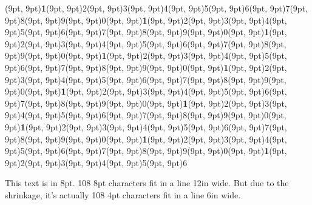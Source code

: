 \documentclass[10,a4paper]{article}
\newcommand{\highlight}[1]{{\color{red}\textbf{1}}}
\begin{document}
{{\begin{minipage}{12in}
\vspace{0.7\baselineskip}

\framebox(9pt, 9pt){\highlight{1}}\framebox(9pt,
9pt){2}\framebox(9pt, 9pt){3}\framebox(9pt,
9pt){4}\framebox(9pt, 9pt){5}\framebox(9pt,
9pt){6}\framebox(9pt, 9pt){7}\framebox(9pt,
9pt){8}\framebox(9pt, 9pt){9}\noindent\framebox(9pt, 9pt){0}\framebox(9pt, 9pt){\highlight{1}}\framebox(9pt,
9pt){2}\framebox(9pt, 9pt){3}\framebox(9pt,
9pt){4}\framebox(9pt, 9pt){5}\framebox(9pt,
9pt){6}\framebox(9pt, 9pt){7}\framebox(9pt,
9pt){8}\framebox(9pt, 9pt){9}\noindent\framebox(9pt, 9pt){0}\framebox(9pt, 9pt){\highlight{1}}\framebox(9pt,
9pt){2}\framebox(9pt, 9pt){3}\framebox(9pt,
9pt){4}\framebox(9pt, 9pt){5}\framebox(9pt,
9pt){6}\framebox(9pt, 9pt){7}\framebox(9pt,
9pt){8}\framebox(9pt, 9pt){9}\noindent\framebox(9pt, 9pt){0}\framebox(9pt, 9pt){\highlight{1}}\framebox(9pt,
9pt){2}\framebox(9pt, 9pt){3}\framebox(9pt,
9pt){4}\framebox(9pt, 9pt){5}\framebox(9pt,
9pt){6}\framebox(9pt, 9pt){7}\framebox(9pt,
9pt){8}\framebox(9pt, 9pt){9}\framebox(9pt, 9pt){0}\framebox(9pt, 9pt){\highlight{1}}\framebox(9pt,
9pt){2}\framebox(9pt, 9pt){3}\framebox(9pt,
9pt){4}\framebox(9pt, 9pt){5}\framebox(9pt,
9pt){6}\framebox(9pt, 9pt){7}\framebox(9pt,
9pt){8}\framebox(9pt, 9pt){9}\noindent\framebox(9pt, 9pt){0}\framebox(9pt, 9pt){\highlight{1}}\framebox(9pt,
9pt){2}\framebox(9pt, 9pt){3}\framebox(9pt,
9pt){4}\framebox(9pt, 9pt){5}\framebox(9pt,
9pt){6}\framebox(9pt, 9pt){7}\framebox(9pt,
9pt){8}\framebox(9pt, 9pt){9}\noindent\framebox(9pt, 9pt){0}\framebox(9pt, 9pt){\highlight{1}}\framebox(9pt,
9pt){2}\framebox(9pt, 9pt){3}\framebox(9pt,
9pt){4}\framebox(9pt, 9pt){5}\framebox(9pt,
9pt){6}\framebox(9pt, 9pt){7}\framebox(9pt,
9pt){8}\framebox(9pt, 9pt){9}\noindent\framebox(9pt, 9pt){0}\framebox(9pt, 9pt){\highlight{1}}\framebox(9pt,
9pt){2}\framebox(9pt, 9pt){3}\framebox(9pt,
9pt){4}\framebox(9pt, 9pt){5}\framebox(9pt,
9pt){6}\framebox(9pt, 9pt){7}\framebox(9pt,
9pt){8}\framebox(9pt, 9pt){9}\noindent\framebox(9pt, 9pt){0}\framebox(9pt, 9pt){\highlight{1}}\framebox(9pt,
9pt){2}\framebox(9pt, 9pt){3}\framebox(9pt,
9pt){4}\framebox(9pt, 9pt){5}\framebox(9pt,
9pt){6}\framebox(9pt, 9pt){7}\framebox(9pt,
9pt){8}\framebox(9pt, 9pt){9}\framebox(9pt, 9pt){0}\framebox(9pt, 9pt){\highlight{1}}\framebox(9pt,
9pt){2}\framebox(9pt, 9pt){3}\framebox(9pt,
9pt){4}\framebox(9pt, 9pt){5}\framebox(9pt,
9pt){6}


\vspace{0.7\baselineskip}

This text is in 8pt.  108 8pt characters fit in a line 12in wide. But
due to the shrinkage, it's actually 108 4pt characters fit in a line 6in wide.


\end{minipage}}}
\end{document}
